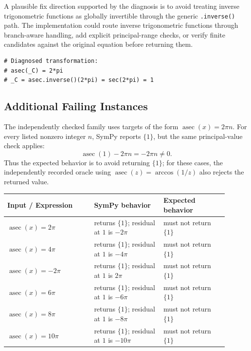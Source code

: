 \documentclass[11pt]{article}
\begin{document}
A plausible fix direction supported by the diagnosis is to avoid treating
inverse trigonometric functions as globally invertible through the generic
\texttt{.inverse()} path.  The implementation could route inverse trigonometric
functions through branch-aware handling, add explicit principal-range checks, or
verify finite candidates against the original equation before returning them.

\begin{lstlisting}[style=bugpython]
# Diagnosed transformation:
# asec(_C) = 2*pi
# _C = asec.inverse()(2*pi) = sec(2*pi) = 1
\end{lstlisting}

\subsection{Additional Failing Instances}

The independently checked family uses targets of the form
\(\operatorname{asec}(x)=2\pi n\).  For every listed nonzero integer \(n\),
SymPy reports \(\{1\}\), but the same principal-value check applies:
\[
  \operatorname{asec}(1) - 2\pi n = -2\pi n \ne 0.
\]
Thus the expected behavior is to avoid returning \(\{1\}\); for these cases,
the independently recorded oracle using
\(\operatorname{asec}(z)=\arccos(1/z)\) also rejects the returned value.

\begin{center}
\footnotesize
\renewcommand{\arraystretch}{1.3}
\begin{tabular}{@{}>{\raggedright\arraybackslash}p{0.35\linewidth}>{\raggedright\arraybackslash}p{0.29\linewidth}>{\raggedright\arraybackslash}p{0.26\linewidth}@{}}
\toprule
\textbf{Input / Expression} & \textbf{SymPy behavior} & \textbf{Expected behavior} \\
\midrule
\(\operatorname{asec}(x)=2\pi\) & returns \(\{1\}\); residual at \(1\) is \(-2\pi\) & must not return \(\{1\}\) \\
\(\operatorname{asec}(x)=4\pi\) & returns \(\{1\}\); residual at \(1\) is \(-4\pi\) & must not return \(\{1\}\) \\
\(\operatorname{asec}(x)=-2\pi\) & returns \(\{1\}\); residual at \(1\) is \(2\pi\) & must not return \(\{1\}\) \\
\(\operatorname{asec}(x)=6\pi\) & returns \(\{1\}\); residual at \(1\) is \(-6\pi\) & must not return \(\{1\}\) \\
\(\operatorname{asec}(x)=8\pi\) & returns \(\{1\}\); residual at \(1\) is \(-8\pi\) & must not return \(\{1\}\) \\
\(\operatorname{asec}(x)=10\pi\) & returns \(\{1\}\); residual at \(1\) is \(-10\pi\) & must not return \(\{1\}\) \\
\bottomrule
\end{tabular}
\end{center}
\end{document}
